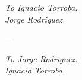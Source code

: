 \null\vfill
\begin{centering}

\emph{To Ignacio Torroba.}
\\
\emph{Jorge Rodriguez}

\vspace{2cm}
---
\vspace{2cm}

\emph{To Jorge Rodriguez.}
\\
\emph{Ignacio Torroba}

\end{centering}
\null\vfill